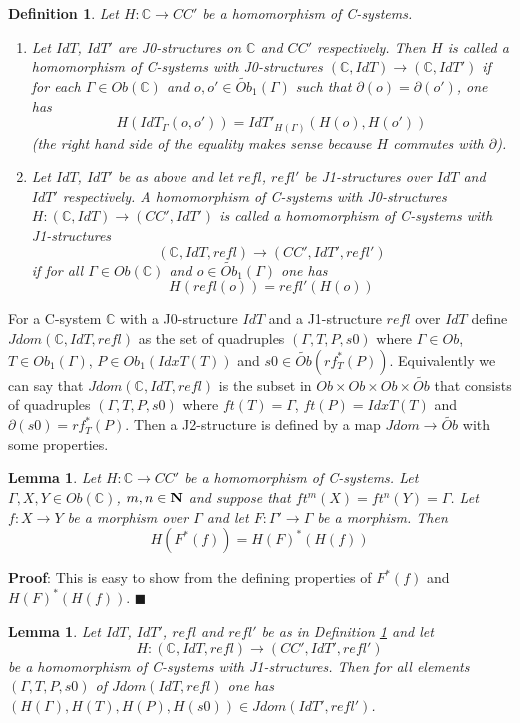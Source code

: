 \documentclass[12pt]{article}
\numberwithin{equation}{section}
\newenvironment{myproof}{{\bf Proof}:}{$\blacksquare$ \vskip 5mm }
\newtheorem{lemma}[proposition]{Lemma}
\newtheorem{definition}[proposition]{Definition}
\newcommand{\llabel}[1]{\label{#1}}
\newcommand{\sr}{\rightarrow}
\newcommand{\nn}{{\bf N\rm}}
\newcommand{\wt}{\widetilde}
\newcommand{\aCC}{{\mathbb C}}  %
\begin{document}
%
\begin{definition}
\llabel{2015.04.06.def1} Let $H:\aCC\sr CC'$ be a homomorphism of C-systems.
%
\begin{enumerate}
\item Let $IdT$, $IdT'$ are J0-structures on $\aCC$ and $CC'$ respectively.  Then
  $H$ is called a homomorphism of C-systems with J0-structures $(\aCC,IdT)\sr
  (\aCC,IdT')$ if for each $\Gamma\in Ob(\aCC)$ and $o,o'\in\wt{Ob}_1(\Gamma)$ such
  that $\partial(o)=\partial(o')$, one has
%
$$H(IdT_{\Gamma}(o,o'))=IdT'_{H(\Gamma)}(H(o),H(o'))$$
%
(the right hand side of the equality makes sense because $H$ commutes with
  $\partial$).
% 
\item Let $IdT$, $IdT'$ be as above and let $refl$, $refl'$ be J1-structures
  over $IdT$ and $IdT'$ respectively. A homomorphism of C-systems with
  J0-structures $H:(\aCC,IdT)\sr (CC',IdT')$ is called a homomorphism of
  C-systems with J1-structures
%
$$(\aCC,IdT,refl)\sr (CC',IdT',refl')$$
%
if for all $\Gamma\in Ob(\aCC)$ and $o\in \wt{Ob}_1(\Gamma)$ one has
%
$$H(refl(o))=refl'(H(o))$$
%
\end{enumerate}
\end{definition}
%
For a C-system $\aCC$ with a J0-structure $IdT$ and a J1-structure $refl$ over
$IdT$ define $Jdom(\aCC,IdT,refl)$ as the set of quadruples $(\Gamma,T,P,s0)$
where $\Gamma\in Ob$, $T\in Ob_1(\Gamma)$, $P\in Ob_1(IdxT(T))$ and $s0\in
\wt{Ob}(rf_T^*(P))$. Equivalently we can say that $Jdom(\aCC,IdT,refl)$ is the
subset in $Ob\times Ob\times Ob\times \wt{Ob}$ that consists of quadruples
$(\Gamma,T,P,s0)$ where $ft(T)=\Gamma$, $ft(P)=IdxT(T)$ and
$\partial(s0)=rf_T^*(P)$. Then a J2-structure is defined by a map $Jdom\sr
\wt{Ob}$ with some properties.
%
\begin{lemma}
\llabel{2015.04.06.l3} Let $H:\aCC\sr CC'$ be a homomorphism of C-systems. Let
$\Gamma,X,Y\in Ob(\aCC)$, $m,n\in\nn$ and suppose that
$ft^m(X)=ft^{n}(Y)=\Gamma$. Let $f:X\sr Y$ be a morphism over $\Gamma$ and let
$F:\Gamma'\sr \Gamma$ be a morphism. Then
%
$$H(F^*(f))=H(F)^*(H(f))$$
%
\end{lemma}
%
\begin{myproof}
This is easy to show from the defining properties of $F^*(f)$ and
$H(F)^*(H(f))$.
\end{myproof}
%
%
\begin{lemma}
\llabel{2015.04.06.l2} Let $IdT$, $IdT'$, $refl$ and $refl'$ be as in
Definition \ref{2015.04.06.def1} and let
%
$$H:(\aCC,IdT,refl)\sr (CC',IdT',refl')$$
%
be a homomorphism of C-systems with J1-structures. Then for all elements
$(\Gamma,T,P,s0)$ of $Jdom(IdT,refl)$ one has $(H(\Gamma),H(T),H(P),H(s0))\in
Jdom(IdT',refl')$.
\end{lemma}
\end{document}
